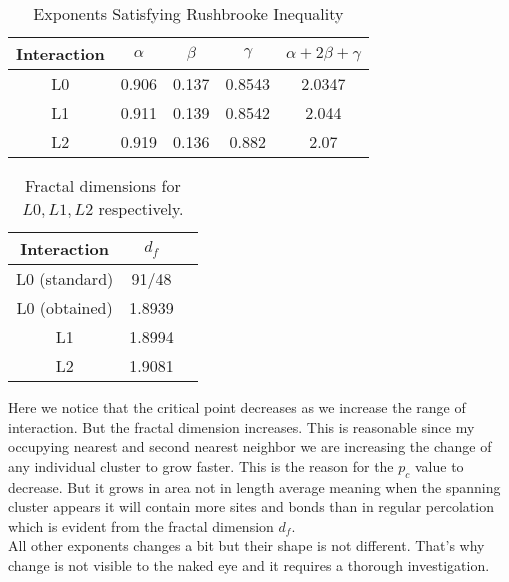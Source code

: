 \begin{table}
\centering
\begin{tabular}{|c|c|c|c|c|}
	\hline
	Interaction & $\alpha$ & $\beta$ & $\gamma$ & $\alpha+2\beta+\gamma$ \\ \hline
	L0  & 0.906 & 0.137 & 0.8543 & 2.0347   \\ \hline
	L1  & 0.911 & 0.139 & 0.8542 & 2.044   \\ \hline
	L2  & 0.919 & 0.136 & 0.882  & 2.07    \\ \hline
\end{tabular}
\caption{Exponents Satisfying Rushbrooke Inequality}
\label{tab:rushbrooke}
\end{table}

\begin{table}
	\centering
	\begin{tabular}{|c|c|c|}
		\hline
		Interaction 	& $d_f$     \\ \hline
		L0 (standard) 	& 91/48     \\ \hline
		L0 (obtained)	& 1.8939   \\ \hline
		L1				& 1.8994      \\ \hline
		L2				& 1.9081     \\ \hline
	\end{tabular}
	\caption{Fractal dimensions for $L0,L1,L2$ respectively.}
	\label{tab:cluster-info}
\end{table}
		
Here we notice that the critical point decreases as we increase the range of interaction. But the fractal dimension increases. This is reasonable since my occupying nearest and second nearest neighbor we are increasing the change of any individual cluster to grow faster. This is the reason for the $p_c$ value to decrease. But it grows in area not in length average meaning when the spanning cluster appears it will contain more sites and bonds than in regular percolation which is evident from the fractal dimension $d_f$. \\
All other exponents changes a bit but their shape is not different. That's why change is not visible to the naked eye and it requires a thorough investigation.